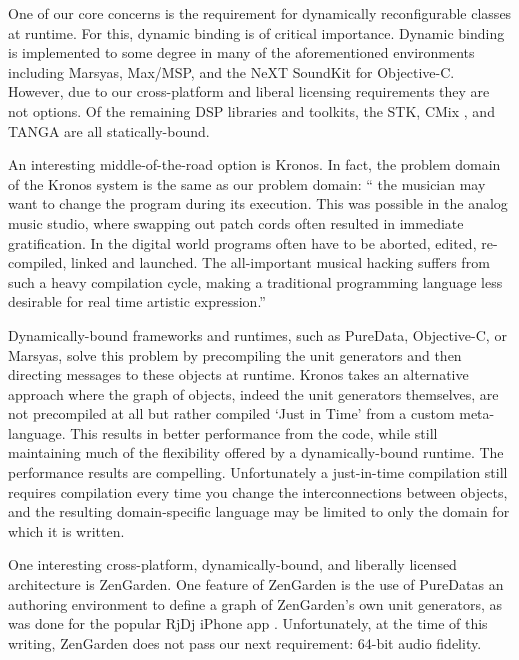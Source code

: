 \documentclass[twoside,10pt]{article}
\begin{document}
One of our core concerns is the requirement for dynamically reconfigurable classes at runtime.  For this, dynamic binding is of critical importance.  Dynamic binding is implemented to some degree in many of the aforementioned environments including Marsyas, Max/MSP, and the NeXT SoundKit for Objective-C.  However, due to our cross-platform and liberal licensing requirements they are not options.  Of the remaining DSP libraries and toolkits, the STK\cite{Cook:1999}, CMix \cite{Lansky:1990}, and TANGA \cite{Reiter:2007} are all statically-bound.  


An interesting middle-of-the-road option is Kronos.  In fact, the problem domain of the Kronos system is the same as our problem domain: `` the musician may want to change the program during its execution. This was possible in the analog music studio, where swapping out patch cords often resulted in immediate gratification. In the digital world programs often have to be aborted, edited, re-compiled, linked and launched. The all-important musical hacking suffers from such a heavy compilation cycle, making a traditional programming language less desirable for real time artistic expression.'' \cite{Norilo:2009}

Dynamically-bound frameworks and runtimes, such as PureData, Objective-C, or Marsyas, solve this problem by precompiling the unit generators and then directing messages to these objects at runtime.  Kronos takes an alternative approach where the graph of objects, indeed the unit generators themselves, are not precompiled at all but rather compiled `Just in Time' from a custom meta-language. This results in better performance from the code, while still maintaining much of the flexibility offered by a dynamically-bound runtime.  The performance results are compelling.  Unfortunately a just-in-time compilation still requires compilation every time you change the interconnections between objects, and the resulting domain-specific language may be limited to only the domain for which it is written.

One interesting cross-platform, dynamically-bound, and liberally licensed architecture is ZenGarden\cite{web4}.  One feature of ZenGarden is the use of PureDatas an authoring environment to define a graph of ZenGarden's own unit generators, as was done for the popular RjDj iPhone app \cite{web5}.  Unfortunately, at the time of this writing, ZenGarden does not pass our next requirement: 64-bit audio fidelity.
\end{document}
